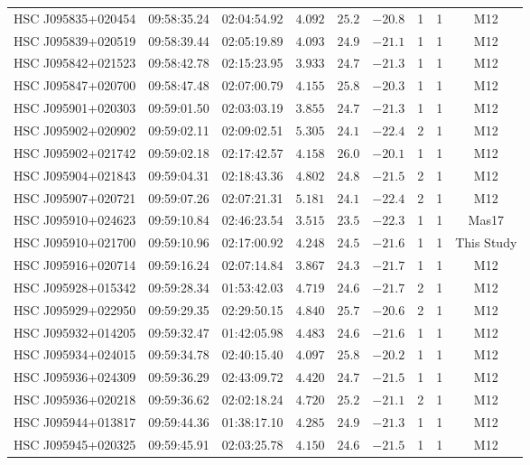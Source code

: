 \documentclass[]{pasj01}
\begin{document}
{\begin{longtable}{ccccccccc}
HSC J095835+020454 & 09:58:35.24 & 02:04:54.92 & $4.092$ & $25.2$ & $-20.8$ & 1 & 1 & M12 \\
HSC J095839+020519 & 09:58:39.44 & 02:05:19.89 & $4.093$ & $24.9$ & $-21.1$ & 1 & 1 & M12 \\
HSC J095842+021523 & 09:58:42.78 & 02:15:23.95 & $3.933$ & $24.7$ & $-21.3$ & 1 & 1 & M12 \\
HSC J095847+020700 & 09:58:47.48 & 02:07:00.79 & $4.155$ & $25.8$ & $-20.3$ & 1 & 1 & M12 \\
HSC J095901+020303 & 09:59:01.50 & 02:03:03.19 & $3.855$ & $24.7$ & $-21.3$ & 1 & 1 & M12 \\
HSC J095902+020902 & 09:59:02.11 & 02:09:02.51 & $5.305$ & $24.1$ & $-22.4$ & 2 & 1 & M12 \\
HSC J095902+021742 & 09:59:02.18 & 02:17:42.57 & $4.158$ & $26.0$ & $-20.1$ & 1 & 1 & M12 \\
HSC J095904+021843 & 09:59:04.31 & 02:18:43.36 & $4.802$ & $24.8$ & $-21.5$ & 2 & 1 & M12 \\
HSC J095907+020721 & 09:59:07.26 & 02:07:21.31 & $5.181$ & $24.1$ & $-22.4$ & 2 & 1 & M12 \\
HSC J095910+024623 & 09:59:10.84 & 02:46:23.54 & $3.515$ & $23.5$ & $-22.3$ & 1 & 1 & Mas17 \\
HSC J095910+021700 & 09:59:10.96 & 02:17:00.92 & $4.248$ & $24.5$ & $-21.6$ & 1 & 1 & This Study \\
HSC J095916+020714 & 09:59:16.24 & 02:07:14.84 & $3.867$ & $24.3$ & $-21.7$ & 1 & 1 & M12 \\
HSC J095928+015342 & 09:59:28.34 & 01:53:42.03 & $4.719$ & $24.6$ & $-21.7$ & 2 & 1 & M12 \\
HSC J095929+022950 & 09:59:29.35 & 02:29:50.15 & $4.840$ & $25.7$ & $-20.6$ & 2 & 1 & M12 \\
HSC J095932+014205 & 09:59:32.47 & 01:42:05.98 & $4.483$ & $24.6$ & $-21.6$ & 1 & 1 & M12 \\
HSC J095934+024015 & 09:59:34.78 & 02:40:15.40 & $4.097$ & $25.8$ & $-20.2$ & 1 & 1 & M12 \\
HSC J095936+024309 & 09:59:36.29 & 02:43:09.72 & $4.420$ & $24.7$ & $-21.5$ & 1 & 1 & M12 \\
HSC J095936+020218 & 09:59:36.62 & 02:02:18.24 & $4.720$ & $25.2$ & $-21.1$ & 2 & 1 & M12 \\
HSC J095944+013817 & 09:59:44.36 & 01:38:17.10 & $4.285$ & $24.9$ & $-21.3$ & 1 & 1 & M12 \\
HSC J095945+020325 & 09:59:45.91 & 02:03:25.78 & $4.150$ & $24.6$ & $-21.5$ & 1 & 1 & M12 \\

\end{longtable}}
\end{document}
